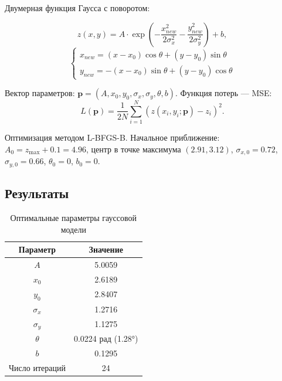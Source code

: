 Двумерная функция Гаусса с поворотом:

\begin{equation}\label{eq:gauss}
    z(x, y) = A \cdot \exp\left(-\frac{x_{new}^2}{2\sigma_x^2} - \frac{y_{new}^2}{2\sigma_y^2}\right) + b,
\end{equation}
\begin{equation}
    \begin{cases}
        x_{new} = (x - x_0)\cos\theta + (y - y_0)\sin\theta \\
        y_{new} = -(x - x_0)\sin\theta + (y - y_0)\cos\theta
    \end{cases}
\end{equation}

Вектор параметров: $\mathbf{p} = (A, x_0, y_0, \sigma_x, \sigma_y, \theta, b)$. Функция потерь --- MSE:
\begin{equation}
    L(\mathbf{p}) = \frac{1}{2N}\sum_{i=1}^{N}\left(z(x_i, y_i; \mathbf{p}) - z_i\right)^2.
\end{equation}

Оптимизация методом L-BFGS-B. Начальное приближение: $A_0 = z_{\max} + 0.1 = 4.96$, центр в точке максимума $(2.91, 3.12)$, $\sigma_{x,0} = 0.72$, $\sigma_{y,0} = 0.66$, $\theta_0 = 0$, $b_0 = 0$.

\subsection{Результаты}

\begin{table}[H]
    \centering
    \caption{Оптимальные параметры гауссовой модели}
    \label{tab:gauss_params}
    \begin{tabular}{|c|c|}
        \hline
        \textbf{Параметр} & \textbf{Значение} \\
        \hline
        $A$ & 5.0059 \\
        $x_0$ & 2.6189 \\
        $y_0$ & 2.8407 \\
        $\sigma_x$ & 1.2716 \\
        $\sigma_y$ & 1.1275 \\
        $\theta$ & 0.0224 рад (1.28°) \\
        $b$ & 0.1295 \\
        \hline
        Число итераций & 24 \\
        \hline
    \end{tabular}
\end{table}


